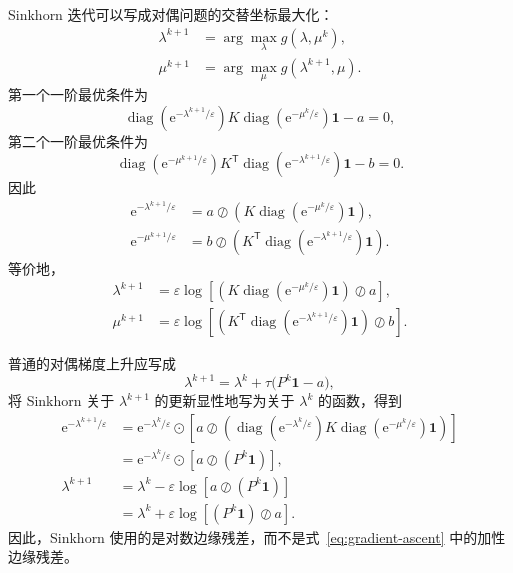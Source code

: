 \documentclass[11pt,a4paper]{ctexart}
\newcommand{\diag}{\operatorname{diag}}
\newcommand{\e}{\mathrm{e}}
\newcommand{\vone}{\bm{1}}
\newcommand{\trans}{\mathsf{T}}
\begin{document}
Sinkhorn 迭代可以写成对偶问题的交替坐标最大化：
\begin{equation}
\begin{aligned}
  \lambda^{k+1}
  &=\arg\max_{\lambda}g(\lambda,\mu^k),\\
  \mu^{k+1}
  &=\arg\max_{\mu}g(\lambda^{k+1},\mu).
\end{aligned}
\end{equation}
第一个一阶最优条件为
\begin{equation}
  \diag\!\left(\e^{-\lambda^{k+1}/\varepsilon}\right)
  K\diag\!\left(\e^{-\mu^k/\varepsilon}\right)\vone-a=0,
\end{equation}
第二个一阶最优条件为
\begin{equation}
  \diag\!\left(\e^{-\mu^{k+1}/\varepsilon}\right)
  K^{\trans}\diag\!\left(\e^{-\lambda^{k+1}/\varepsilon}\right)\vone-b=0.
\end{equation}
因此
\begin{equation}\label{eq:dual-coordinate-update}
\begin{aligned}
  \e^{-\lambda^{k+1}/\varepsilon}
  &=a\oslash
    \left(K\diag\!\left(\e^{-\mu^k/\varepsilon}\right)\vone\right),\\
  \e^{-\mu^{k+1}/\varepsilon}
  &=b\oslash
    \left(K^{\trans}\diag\!\left(\e^{-\lambda^{k+1}/\varepsilon}\right)\vone\right).
\end{aligned}
\end{equation}
等价地，
\begin{equation}\label{eq:lambda-mu-update}
\begin{aligned}
  \lambda^{k+1}
  &=\varepsilon\log\!\left[
      \left(K\diag\!\left(\e^{-\mu^k/\varepsilon}\right)\vone\right)
      \oslash a\right],\\
  \mu^{k+1}
  &=\varepsilon\log\!\left[
      \left(K^{\trans}\diag\!\left(\e^{-\lambda^{k+1}/\varepsilon}\right)\vone\right)
      \oslash b\right].
\end{aligned}
\end{equation}

普通的对偶梯度上升应写成
\begin{equation}\label{eq:gradient-ascent}
  \lambda^{k+1}
  =\lambda^k+\tau\bigl(P^k\vone-a\bigr),
\end{equation}
将 Sinkhorn 关于 $\lambda^{k+1}$ 的更新显性地写为关于 $\lambda^k$ 的函数，得到
\begin{equation}
\begin{aligned}
  \e^{-\lambda^{k+1}/\varepsilon}
  &=\e^{-\lambda^k/\varepsilon}
  \odot\left[a\oslash\left(\diag\!\left(\e^{-\lambda^k/\varepsilon}\right)
   K
   \diag\!\left(\e^{-\mu^k/\varepsilon}\right)\vone\right)\right]\\
  &=\e^{-\lambda^k/\varepsilon}
  \odot\left[a\oslash(P^k\vone)\right],\\
  \lambda^{k+1}
  &=\lambda^k-\varepsilon\log\!\left[a\oslash(P^k\vone)\right]\\
  &=\lambda^k+\varepsilon\log\!\left[(P^k\vone)\oslash a\right].
\end{aligned}
\end{equation}
因此，Sinkhorn 使用的是对数边缘残差，而不是式~\eqref{eq:gradient-ascent} 中的加性边缘残差。
\end{document}
